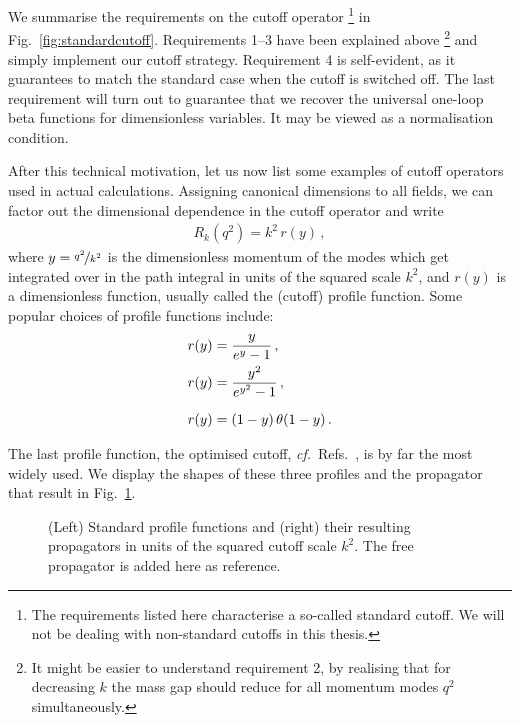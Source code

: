 \documentclass[11pt]{book}
\newcommand\cf{\textit{cf.}\ }
\numberwithin{equation}{chapter}
\begin{document}
\noindent
We summarise the requirements on the cutoff operator%
\footnote{%
  The requirements listed here characterise a so-called
  standard cutoff. We will not be dealing with
  non-standard cutoffs in this thesis.
}
in Fig.~\ref{fig:standardcutoff}. Requirements 1--3
have been explained above%
\footnote{%
  It might be easier to understand requirement 2, by realising
  that for decreasing $k$ the mass gap should reduce for all
  momentum modes $q^2$ simultaneously.
}
and simply implement our cutoff strategy. Requirement 4
is self-evident, as it guarantees to match the standard case when the
cutoff is switched off. The last requirement will turn out to guarantee that
we recover the universal one-loop beta functions for dimensionless
variables. It may be viewed as a normalisation condition.

After this technical motivation, let us now list some examples of
cutoff operators used in actual calculations. Assigning canonical
dimensions to all fields, we can factor out the dimensional
dependence in the cutoff operator and write
\begin{align}
  R_k(q^2) = k^2 \, r(y) \,,
\end{align}
where $y=\nicefrac{q^2}{k^2}$ is the dimensionless momentum
of the modes which get integrated over in the path integral
in units of the squared scale $k^2$, and $r(y)$ is a dimensionless
function, usually called the (cutoff) profile function.
Some popular choices of profile functions include:
\begin{align}
  r(y) &= \frac{ y }{ e^y - 1} \,, \\
  r(y) &= \frac{ y^2 }{ e^{y^2} - 1} \,, \\
  r(y) &= \vphantom{ \frac{ y^2 }{ e^{y^2} - 1} } (1-y) \, \theta(1-y) \,.
\end{align}
The last profile function,
the optimised cutoff, \cf Refs.~\cite{Litim:2000ci,Litim:2001up},
is by far the most widely used.
We display the shapes of these three profiles and the propagator that
result in Fig.~\ref{fig:profiles}.

\begin{figure}
  \begin{center}
    
  \end{center}
  \caption{
    (Left) Standard profile functions and
    (right) their resulting propagators in units of
    the squared cutoff scale $k^2$.
    The free propagator is added here as reference.
  }
  \label{fig:profiles}
\end{figure}
\end{document}
